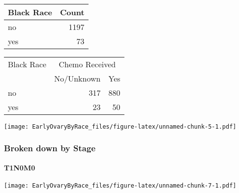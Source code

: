 \documentclass[
]{article}
\newenvironment{Shaded}{\begin{snugshade}}{\end{snugshade}}
\newcommand{\DataTypeTok}[1]{\textcolor[rgb]{0.13,0.29,0.53}{#1}}
\newcommand{\DecValTok}[1]{\textcolor[rgb]{0.00,0.00,0.81}{#1}}
\newcommand{\KeywordTok}[1]{\textcolor[rgb]{0.13,0.29,0.53}{\textbf{#1}}}
\newcommand{\NormalTok}[1]{#1}
\newcommand{\OperatorTok}[1]{\textcolor[rgb]{0.81,0.36,0.00}{\textbf{#1}}}
\newcommand{\StringTok}[1]{\textcolor[rgb]{0.31,0.60,0.02}{#1}}
\begin{document}
\begin{tabular}[t]{l|r}
\hline
Black Race & Count\\
\hline
no & 1197\\
\hline
yes & 73\\
\hline
\end{tabular}

\begin{Shaded}
\end{Shaded}

\begin{tabular}[t]{l|r|r}
\hline
\multicolumn{1}{c|}{Black Race} & \multicolumn{2}{c}{Chemo Received} \\
\cline{1-1} \cline{2-3}
  & No/Unknown & Yes\\
\hline
no & 317 & 880\\
\hline
yes & 23 & 50\\
\hline
\end{tabular}

\texttt{[image: EarlyOvaryByRace\_files/figure-latex/unnamed-chunk-5-1.pdf]}

\hypertarget{broken-down-by-stage}{%
\subsubsection{Broken down by Stage}\label{broken-down-by-stage}}

\hypertarget{t1n0m0}{%
\paragraph{T1N0M0}\label{t1n0m0}}

\texttt{[image: EarlyOvaryByRace\_files/figure-latex/unnamed-chunk-7-1.pdf]}
\end{document}
